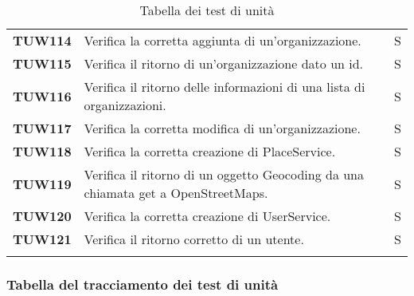 \documentclass[../../piano-di-qualifica.tex]{subfiles}
\begin{document}
\begin{longtable}[H]{>{\centering\bfseries}m{3cm} >{}m{10cm} >{\centering\arraybackslash}m{3cm}}
TUW114             & Verifica la corretta aggiunta di un'organizzazione. & S \\ 
 
TUW115             & Verifica il ritorno di un'organizzazione dato un id. & S \\ 

TUW116             & Verifica il ritorno delle informazioni di una lista di organizzazioni. & S \\ 

TUW117             & Verifica la corretta modifica di un'organizzazione. & S \\ 

TUW118             & Verifica la corretta creazione di PlaceService. & S \\ 

TUW119             & Verifica il ritorno di un oggetto Geocoding da una chiamata get a OpenStreetMaps. & S \\ 
 

TUW120             & Verifica la corretta creazione di UserService. & S \\ 

TUW121             & Verifica il ritorno corretto di un utente. & S \\ 

  \rowcolor{white}
  \caption{Tabella dei test di unità}%
  \label{tab:test_di_unità}
\end{longtable}




\newpage
\subsubsection{Tabella del tracciamento dei test di unità}%
\label{subsub:tabella_tracciamento_test_di_unita}
\end{document}
